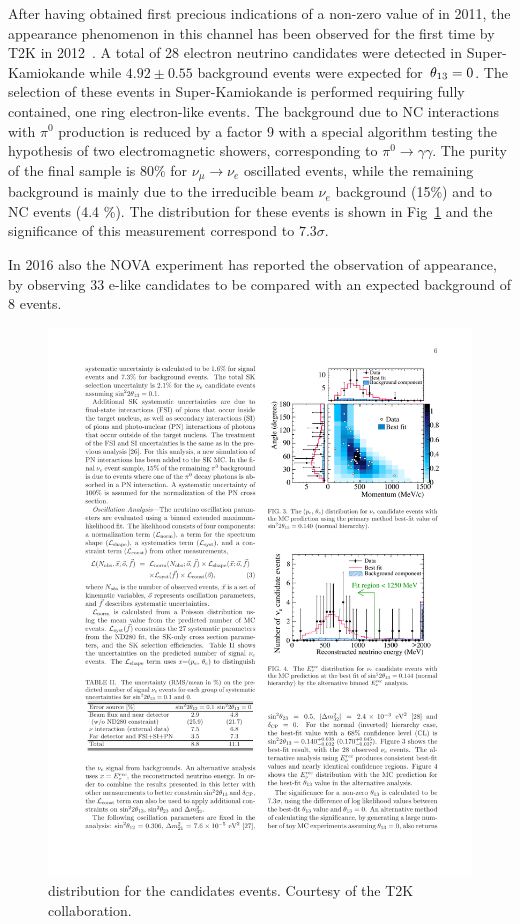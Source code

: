 After having obtained first precious indications of a non-zero value of \thint in 2011,  the \nue appearance phenomenon in this channel has been observed for the first time by T2K in 2012~\cite{Abe:2013hdq}. A total of 28 electron neutrino candidates were detected in Super-Kamiokande while $4.92\pm0.55$ background events were expected for $\textrm \,\theta_{13}=0$. The selection of these events in Super-Kamiokande is performed requiring fully contained, one ring electron-like events. The background due to NC interactions with $\pi^0$ production is reduced by a factor 9 with a special algorithm testing the hypothesis of two electromagnetic showers, corresponding to $\pi^0 \rightarrow \gamma \gamma$. The purity of the final sample is 80\% for $\nu_\mu \rightarrow \nu_e$ oscillated events, while the remaining background is mainly due to the irreducible beam $\nu_e$ background (15\%) and to NC events (4.4 \%). 
The \ptheta distribution for these events is shown in Fig~\ref{fig:t2kapp} and the significance of this measurement correspond to $7.3\sigma$. 

In 2016 also the NOVA experiment has reported the observation of \nue appearance, by observing 33 e-like candidates to be compared with an expected background of 8 events.%

\begin{figure} [htbp!]
\begin{center}
\includegraphics[width=14cm]{figures/nueapp_ptheta.pdf}
\caption{\label{fig:t2kapp} \ptheta distribution for the \nue candidates events. Courtesy of the T2K collaboration.}
\end{center}
\end{figure}



